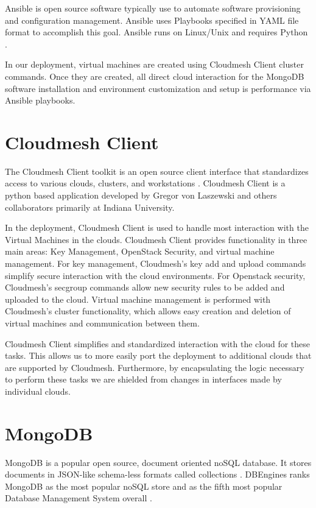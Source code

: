\documentclass[9pt,twocolumn,twoside]{../../styles/osajnl}
\begin{document}
Ansible is open source software typically use to automate software provisioning and configuration management.  Ansible uses Playbooks specified in YAML file format to accomplish this goal.  Ansible runs on Linux/Unix and requires Python \cite{www-wikiAnsible}.

In our deployment, virtual machines are created using Cloudmesh Client cluster commands.  Once they are created, all direct cloud interaction for the MongoDB software installation and environment customization and setup is performance via Ansible playbooks.



\section{Cloudmesh Client}

The Cloudmesh Client toolkit is an open source client interface that standardizes access to various clouds, clusters, and workstations \cite{www-cloudmesh}.  Cloudmesh Client is a python based application developed by Gregor von Laszewski and others collaborators primarily at Indiana University.

In the deployment, Cloudmesh Client is used to handle most interaction with the Virtual Machines in the clouds. Cloudmesh Client provides functionality in three main areas: Key Management, OpenStack Security, and virtual machine management.  For key management, Cloudmesh's key add and upload commands simplify secure interaction with the cloud environments.  For Openstack security, Cloudmesh's secgroup commands allow new security rules to be added and uploaded to the cloud.  Virtual machine management is performed with Cloudmesh's cluster functionality, which allows easy creation and deletion of virtual machines and communication between them.

Cloudmesh Client simplifies and standardized interaction with the cloud for these tasks.  This allows us to more easily port the deployment to additional clouds that are supported by Cloudmesh.  Furthermore, by encapsulating the logic necessary to perform these tasks we are shielded from changes in interfaces made by individual clouds.

\section{MongoDB}

MongoDB is a popular open source, document oriented noSQL database.  It stores documents in JSON-like schema-less formats called collections \cite{www-MonWiki}.  DBEngines ranks MongoDB as the most popular noSQL store and as the fifth most popular Database Management System overall \cite{www-dbEngines}.
\end{document}
